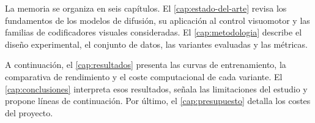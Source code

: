 La memoria se organiza en seis cap\'itulos. El \cref{cap:estado-del-arte} revisa los
fundamentos de los modelos de difusi\'on, su aplicaci\'on al control visuomotor y las
familias de codificadores visuales consideradas. El \cref{cap:metodologia} describe el
dise\~no experimental, el conjunto de datos, las variantes evaluadas y las m\'etricas.

A continuaci\'on, el \cref{cap:resultados} presenta las curvas de entrenamiento, la
comparativa de rendimiento y el coste computacional de cada variante. El
\cref{cap:conclusiones} interpreta esos resultados, se\~nala las limitaciones del estudio
y propone l\'ineas de continuaci\'on. Por \'ultimo, el \cref{cap:presupuesto} detalla los
costes del proyecto.
